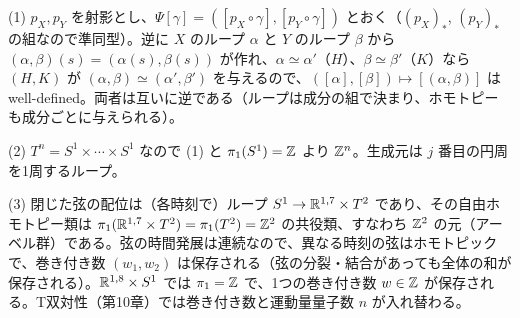 \begin{solution}
(1) $p_X,p_Y$ を射影とし、$\Psi[\gamma]=([p_X\circ\gamma],[p_Y\circ\gamma])$ とおく（$(p_X)_*$, $(p_Y)_*$ の組なので準同型）。逆に $X$ のループ $\alpha$ と $Y$ のループ $\beta$ から $(\alpha,\beta)(s)=(\alpha(s),\beta(s))$ が作れ、$\alpha\simeq\alpha'$（$H$）、$\beta\simeq\beta'$（$K$）なら $(H,K)$ が $(\alpha,\beta)\simeq(\alpha',\beta')$ を与えるので、$([\alpha],[\beta])\mapsto[(\alpha,\beta)]$ は well-defined。両者は互いに逆である（ループは成分の組で決まり、ホモトピーも成分ごとに与えられる）。

(2) $T^n=S^1\times\cdots\times S^1$ なので (1) と $\pi_1(S^1)=\mathbb{Z}$ より $\mathbb{Z}^n$。生成元は $j$ 番目の円周を1周するループ。

(3) 閉じた弦の配位は（各時刻で）ループ $S^1\to\mathbb{R}^{1,7}\times T^2$ であり、その自由ホモトピー類は $\pi_1(\mathbb{R}^{1,7}\times T^2)=\pi_1(T^2)=\mathbb{Z}^2$ の共役類、すなわち $\mathbb{Z}^2$ の元（アーベル群）である。弦の時間発展は連続なので、異なる時刻の弦はホモトピックで、巻き付き数 $(w_1,w_2)$ は保存される（弦の分裂・結合があっても全体の和が保存される）。$\mathbb{R}^{1,8}\times S^1$ では $\pi_1=\mathbb{Z}$ で、1つの巻き付き数 $w\in\mathbb{Z}$ が保存される。T双対性（第10章）では巻き付き数と運動量量子数 $n$ が入れ替わる。
\end{solution}

